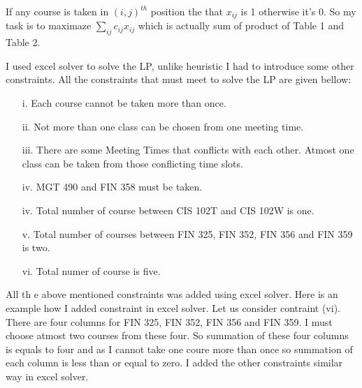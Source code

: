 \documentclass[paper=letter, fontsize=11pt]{scrartcl} %
\begin{document}
If any course is taken in $(i,j)^{th}$ position the that  $x_{ij}$ is 1 otherwise it's 0. So my task is to maximaze $\sum\limits_{ij} c_{ij}x_{ij}$ which is actually sum of product of Table 1 and Table 2.

I used excel solver to solve the LP, unlike heuristic I had to introduce some other constraints. All the constraints that must meet to solve the LP are given bellow:

\begin{enumerate}[align=left,style=nextline,leftmargin=1.5cm,labelsep=\parindent,font=\normalfont]
\item[i.]  Each course cannot be taken more than once.
\item[ii.] Not more than one class can be chosen from one meeting time.
\item[iii.] There are some Meeting Times that conflicts with each other. Atmost one class can be taken from those conflicting time slots.  
\item[iv.] MGT 490 and FIN 358 must be taken.
\item[iv.] Total number of course between CIS 102T and CIS 102W is one.
\item[v.] Total number of courses between FIN 325, FIN 352, FIN 356 and FIN 359 is two.
\item[vi.] Total numer of course is five.
\end{enumerate}  

All th e above mentioned constraints was added using excel solver. Here is an example how I added constraint in excel solver. Let us consider contraint (vi). There are four columns for FIN 325, FIN 352, FIN 356 and FIN 359. I must choose atmost two courses from these four. So summation of these four columns is equals to four and as I cannot take one coure more than once so summation of each column is less than or equal to zero. I added the other constraints similar way in excel solver.



\end{document}
